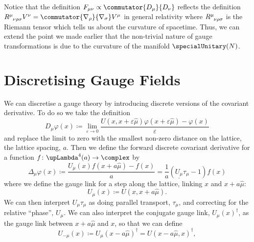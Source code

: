 \documentclass[fleqn]{NotesClass}
\newcommand{\covariantDerivative}{D}
\newcommand{\hermit}{\dagger}
\newcommand{\lattice}[1][4]{\upLambda^{#1}}
\newcommand{\multiplicative}[1]{\underline{#1}}
\newcommand{\forwardGaugeDerivative}{\Delta}
\begin{document}
    Notice that the definition \(F_{\mu\nu} \propto \commutator{\covariantDerivative_\mu}{\covariantDerivative_\nu}\) reflects the definition \(\tensor{R}{^\mu_{\nu\rho\sigma}}V^\nu = \commutator{\nabla_\rho}{\nabla_\sigma}V^\mu\) in general relativity where \(\tensor{R}{^\mu_{\nu\rho\sigma}}\) is the Riemann tensor which tells us about the curvature of spacetime.
    Thus, we can extend the point we made earlier that the non-trivial nature of gauge transformations is due to the curvature of the manifold \(\specialUnitary(N)\).
    
    \section{Discretising Gauge Fields}
    We can discretise a gauge theory by introducing discrete versions of the covariant derivative.
    To do so we take the definition
    \begin{equation}
        \covariantDerivative_\mu \varphi(x) \coloneqq \lim_{\varepsilon \to 0} \frac{U(x, x + \varepsilon\hat\mu)\varphi(x + \varepsilon\hat{\mu}) - \varphi(x)}{\varepsilon}
    \end{equation}
    and replace the limit to zero with the smallest non-zero distance on the lattice, the lattice spacing, \(a\).
    Then we define the forward discrete covariant derivative for a function \(f \colon \lattice(a) \to \complex\) by
    \begin{equation}
        \forwardGaugeDerivative_\mu \varphi(x) \coloneqq \frac{U_\mu(x) f(x + a\hat{\mu}) - f(x)}{a} = \frac{1}{a}(\multiplicative{U_\mu}\tau_\mu - 1)f(x)
    \end{equation}
    where we define the gauge link for a step along the lattice, linking \(x\) and \(x + a\hat{\mu}\):
    \begin{equation}
        U_\mu(x) \coloneqq U(x, x + a\hat{\mu}).
    \end{equation}
    We can then interpret \(U_\mu \tau_\mu\) as doing parallel transport, \(\tau_\mu\), and correcting for the relative \enquote{phase}, \(U_\mu\).
    We can also interpret the conjugate gauge link, \(U_\mu(x)^\hermit\), as the gauge link between \(x + a\hat{\mu}\) and \(x\), so that we can define
    \begin{equation}
        U_{-\mu}(x) \coloneqq U_\mu(x - a\hat{\mu})^\hermit = U(x - a\hat{\mu}, x)^\hermit,
    \end{equation}
    
\end{document}
